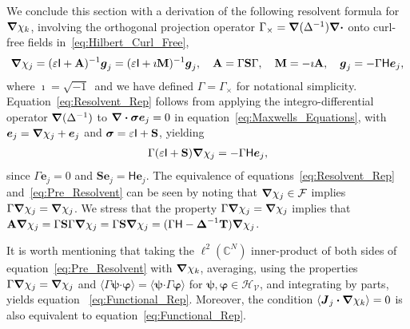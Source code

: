 \documentclass[leqno,onefignum,onetabnum]{siamltex1213}
\newcommand{\Mb}{\mathbf{M}}
\newcommand{\Tb}{\mathbf{T}}
\newcommand{\Sb}{\mathbf{S}}
\newcommand{\Ab}{\mathbf{A}}
\newcommand{\Vc}{\mathcal{V}}
\newcommand{\Hc}{\mathcal{H}}
\newcommand{\Fc}{\mathcal{F}}
\newcommand{\Hm}{\mathsf{H}}
\newcommand{\Ib}{\mathsf{I}}
\newcommand\bsig{\mbox{\boldmath${\sigma}$}}
\newcommand\bDelta{\mbox{\boldmath${\Delta}$}}
\newcommand\bnabla{\mbox{\boldmath${\nabla}$}}
\providecommand\bcdot{\boldsymbol{\cdot}}
\newcommand{\vecJ}{\boldsymbol{J}}
\newcommand{\vecg}{\boldsymbol{g}}
\newcommand{\vece}{\boldsymbol{e}}
\newcommand{\vecpsi}{\boldsymbol{\psi}}
\newcommand{\vecvarphi}{\boldsymbol{\varphi}}
\begin{document}
We conclude this section with a derivation of the following resolvent
formula for $\bnabla \chi_k$, involving the orthogonal projection
operator $\Gamma_\times=\bnabla (\Delta^{-1})\bnabla \bcdot$ onto curl-free
fields in~\eqref{eq:Hilbert_Curl_Free},   
\begin{align}\label{eq:Resolvent_Rep}
  \bnabla \chi_j=(\varepsilon\Ib+\Ab)^{-1}\vecg_j
           =(\varepsilon\Ib+\imath\Mb)^{-1}\vecg_j, \quad
  \Ab=\Gamma\Sb\Gamma, \quad
  \Mb=-\imath\Ab, \quad
  \vecg_j=-\Gamma\Hm\vece _j,
\end{align}
%
where $\imath=\sqrt{-1}\,$ and we have defined $\Gamma=\Gamma_\times$ for
notational simplicity. Equation~\eqref{eq:Resolvent_Rep} follows from
applying the integro-differential operator $\bnabla (\Delta^{-1})$ to
$\bnabla \bcdot\bsig\vece _j=0$ in equation~\eqref{eq:Maxwells_Equations},
with $\vece _j=\bnabla \chi_j+\vece _j$ and $\bsig=\varepsilon\Ib+\Sb$, yielding  
%
\begin{align}\label{eq:Pre_Resolvent}
  \Gamma(\varepsilon\Ib+\Sb)\bnabla \chi_j=-\Gamma\Hm\vece _j,
\end{align}
%
since $\Gamma\vece _j=0$ and $\Sb\vece _j=\Hm\vece _j$.
The equivalence of equations~\eqref{eq:Resolvent_Rep}
and~\eqref{eq:Pre_Resolvent} can be seen by noting that 
$\bnabla \chi_j\in\Fc$ implies $\Gamma\bnabla \chi_j=\bnabla \chi_j$. We stress
that the property $\Gamma\bnabla \chi_j=\bnabla \chi_j$ implies that
$\Ab\bnabla \chi_j=\Gamma\Sb\Gamma\bnabla \chi_j=\Gamma\Sb\bnabla \chi_j
=(\Gamma\Hm-\bDelta^{-1}\Tb)\bnabla \chi_j$. 



It is worth mentioning that taking the  $\ell^2(\mathbb{C}^N)$
inner-product of both sides of equation~\eqref{eq:Pre_Resolvent} with
$\bnabla \chi_k$, averaging, using the properties
$\Gamma\bnabla \chi_j=\bnabla \chi_j$ and
$\langle\Gamma\vecpsi\bcdot\vecvarphi\rangle=\langle\vecpsi\bcdot\Gamma\vecvarphi\rangle$ for 
$\vecpsi,\vecvarphi\in\Hc_{\Vc}$, and integrating by parts, yields
equation ~\eqref{eq:Functional_Rep}. Moreover, the condition
$\langle\vecJ_j\bcdot\bnabla \chi_k\rangle=0$ is also equivalent to
equation~\eqref{eq:Functional_Rep}.    
\end{document}
